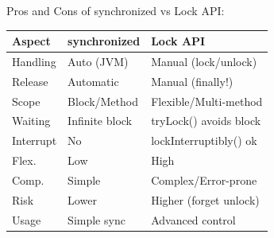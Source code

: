 Pros and Cons of synchronized vs Lock API:

{\scriptsize
\setlength{\tabcolsep}{2pt}
\begin{tabularx}{\columnwidth}{|l|X|X|}
\hline
Aspect & synchronized & Lock API \\\hline\hline
Handling & Auto (JVM) & Manual (lock/unlock) \\\hline
Release & Automatic & Manual (finally!) \\\hline
Scope & Block/Method & Flexible/Multi-method \\\hline
Waiting & Infinite block & tryLock() avoids block \\\hline
Interrupt & No & lockInterruptibly() ok \\\hline
Flex. & Low & High \\\hline
Comp. & Simple & Complex/Error-prone \\\hline
Risk & Lower & Higher (forget unlock) \\\hline
Usage & Simple sync & Advanced control \\\hline
\end{tabularx}
}

